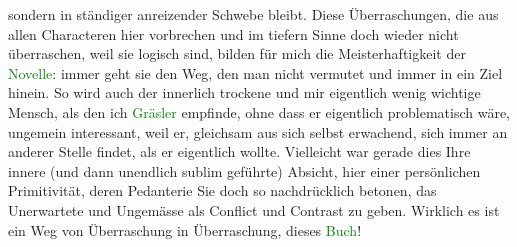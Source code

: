                sondern in ständiger anreizender Schwebe bleibt. Diese Überraschungen, die aus allen
               Characteren hier vorbrechen und im tiefern Sinne doch wieder nicht überraschen, weil
               sie logisch sind, bilden für mich die Meisterhaftigkeit der \textcolor{green}{Novelle}\ledrightnote{{$\rightarrow$}\emph{\textcolor{green}{Doktor Gräsler, Badearzt}}}: immer geht sie den Weg, den man
               nicht vermutet und immer in ein Ziel hinein. So wird auch der innerlich trockene und
               mir eigentlich wenig wichtige Mensch, als den ich \textcolor{green}{Gräsler}\ledrightnote{{$\rightarrow$}\emph{\textcolor{green}{Doktor Gräsler, Badearzt}}} empfinde, ohne dass er eigentlich problematisch
               wäre, ungemein interessant, weil er, gleichsam aus sich selbst erwachend, sich immer
               an anderer Stelle findet, als er eigentlich wollte. Vielleicht war gerade dies Ihre
               innere (und dann unendlich sublim geführte) Absicht, hier einer persönlichen
               Primitivität, deren {\pb}Pedanterie Sie doch
               so nachdrücklich betonen, das Unerwartete und Ungemässe als Conflict und Contrast zu
               geben. Wirklich es ist ein Weg von Überraschung in Überraschung, dieses \textcolor{green}{Buch}\ledrightnote{{$\rightarrow$}\emph{\textcolor{green}{Doktor Gräsler, Badearzt}}}!\pend
           
